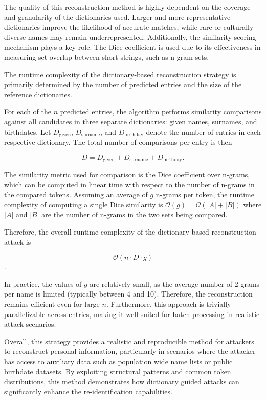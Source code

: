 The quality of this reconstruction method is highly dependent on the coverage and granularity of the dictionaries used.
Larger and more representative dictionaries improve the likelihood of accurate matches, while rare or culturally diverse names may remain underrepresented.
Additionally, the similarity scoring mechanism plays a key role.
The Dice coefficient is used due to its effectiveness in measuring set overlap between short strings, such as n-gram sets.

The runtime complexity of the dictionary-based reconstruction strategy is primarily determined by the number of predicted entries and the size of the reference dictionaries.

For each of the \( n \) predicted entries, the algorithm performs similarity comparisons against all candidates in three separate dictionaries: given names, surnames, and birthdates. Let \( D_{\text{given}} \), \( D_{\text{surname}} \), and \( D_{\text{birthday}} \) denote the number of entries in each respective dictionary. The total number of comparisons per entry is then

\[
D = D_{\text{given}} + D_{\text{surname}} + D_{\text{birthday}}.
\]

The similarity metric used for comparison is the Dice coefficient over n-grams, which can be computed in linear time with respect to the number of n-grams in the compared tokens. Assuming an average of \( g \) n-grams per token, the runtime complexity of computing a single Dice similarity is \( \mathcal{O}(g) = \mathcal{O}(|A| + |B|) \) where \( |A| \) and \( |B| \) are the number of n-grams in the two sets being compared.


Therefore, the overall runtime complexity of the dictionary-based reconstruction attack is

\[
\mathcal{O}(n \cdot D \cdot g)
\].


In practice, the values of $g$ are relatively small, as the average number of 2-grams per name is limited (typically between 4 and 10). Therefore, the reconstruction remains efficient even for large $n$. Furthermore, this approach is trivially parallelizable across entries, making it well suited for batch processing in realistic attack scenarios.


Overall, this strategy provides a realistic and reproducible method for attackers to reconstruct personal information, particularly in scenarios where the attacker has access to auxiliary data such as population wide name lists or public birthdate datasets.
By exploiting structural patterns and common token distributions, this method demonstrates how dictionary guided attacks can significantly enhance the re-identification capabilities.

